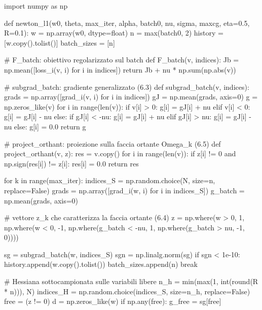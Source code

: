 \begin{pythoncode}[title= Newton-L1]

import numpy as np

def newton_l1(w0, theta, max_iter, alpha, batch0, nu, sigma, maxcg,
              eta=0.5, R=0.1):
    w = np.array(w0, dtype=float)
    n = max(batch0, 2)
    history     = [w.copy().tolist()]
    batch_sizes = [n]

    # F_batch: obiettivo regolarizzato sul batch
    def F_batch(v, indices):
        Jb = np.mean([loss_i(v, i) for i in indices])
        return Jb + nu * np.sum(np.abs(v))

    # subgrad_batch: gradiente generalizzato (6.3)
    def subgrad_batch(v, indices):
        grads = np.array([grad_i(v, i) for i in indices])
        gJ = np.mean(grads, axis=0)
        g = np.zeros_like(v)
        for i in range(len(v)):
            if v[i] > 0:
                g[i] = gJ[i] + nu
            elif v[i] < 0:
                g[i] = gJ[i] - nu
            else:
                if gJ[i] < -nu:
                    g[i] = gJ[i] + nu
                elif gJ[i] > nu:
                    g[i] = gJ[i] - nu
                else:
                    g[i] = 0.0
        return g

    # project_orthant: proiezione sulla faccia ortante Omega_k (6.5)
    def project_orthant(v, z):
        res = v.copy()
        for i in range(len(v)):
            if z[i] != 0 and np.sign(res[i]) != z[i]:
                res[i] = 0.0
        return res

    for k in range(max_iter):
        indices_S = np.random.choice(N, size=n, replace=False)
        grads = np.array([grad_i(w, i) for i in indices_S])
        g_batch = np.mean(grads, axis=0)

        # vettore z_k che caratterizza la faccia ortante (6.4)
        z = np.where(w > 0, 1,
            np.where(w < 0, -1,
                np.where(g_batch < -nu, 1,
                    np.where(g_batch > nu, -1, 0))))

        sg = subgrad_batch(w, indices_S)
        sgn = np.linalg.norm(sg)
        if sgn < 1e-10:
            history.append(w.copy().tolist())
            batch_sizes.append(n)
            break

        # Hessiana sottocampionata sulle variabili libere
        n_h = min(max(1, int(round(R * n))), N)
        indices_H = np.random.choice(indices_S, size=n_h, replace=False)
        free = (z != 0)
        d = np.zeros_like(w)
        if np.any(free):
            g_free = sg[free]


\end{pythoncode}
